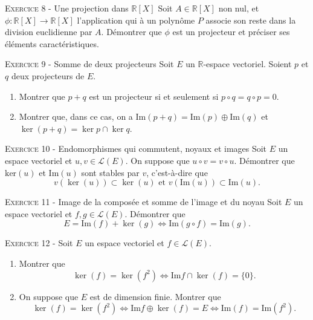 

\vskip0.3cm\noindent\textsc{Exercice 8} - Une projection dans $\mathbb R[X]$
\vskip0.2cm
Soit $A\in\mathbb R[X]$ non nul, et $\phi:\mathbb R[X]\to\mathbb R[X]$ l'application qui à un polynôme $P$ associe son reste dans la division euclidienne par $A$. Démontrer que $\phi$ est un projecteur et préciser ses éléments caractéristiques.




\vskip0.3cm\noindent\textsc{Exercice 9} - Somme de deux projecteurs
\vskip0.2cm
Soit $E$ un $\mathbb R$-espace vectoriel. Soient $p$ et $q$ deux projecteurs de $E$.
\begin{enumerate}
\item Montrer que $p+q$ est un projecteur si et seulement si $p\circ q=q\circ p=0$.
\item Montrer que, dans ce cas, on a $\textrm{Im}(p+q)=\textrm{Im}(p)\oplus \textrm{Im}(q)$
et $\ker(p+q)=\ker p\cap \ker q$.
\end{enumerate}




\vskip0.3cm\noindent\textsc{Exercice 10} - Endomorphismes qui commutent, noyaux et images
\vskip0.2cm
Soit $E$ un espace vectoriel et $u,v\in\mathcal L(E)$. On suppose que $u\circ v=v\circ u$. Démontrer que $\textrm{ker}(u)$ et $\textrm{Im}(u)$ sont stables par $v$, c'est-à-dire que
$$v(\ker (u))\subset \ker (u)\textrm{ et }v(\textrm{Im}(u))\subset \textrm{Im}(u).$$




\vskip0.3cm\noindent\textsc{Exercice 11} - Image de la composée et somme de l'image et du noyau
\vskip0.2cm
Soit $E$ un espace vectoriel et $f,g\in\mathcal L(E)$. Démontrer que 
$$E=\textrm{Im}(f)+\ker(g)\iff \textrm{Im}(g\circ f)=\textrm{Im}(g).$$




\vskip0.3cm\noindent\textsc{Exercice 12} - 
\vskip0.2cm
Soit $E$ un espace vectoriel et $f\in\mathcal L(E)$.
\begin{enumerate}
\item Montrer que
$$\ker(f)=\ker(f^2)\iff \textrm{Im}f\cap\ker(f)=\{0\}.$$
\item On suppose que $E$ est de dimension finie. Montrer que
$$\ker(f)=\ker(f^2)\iff \textrm{Im}f\oplus \ker(f)=E\iff \textrm{Im}(f)=\textrm{Im}(f^2).$$
\end{enumerate}




\vskip0.5cm

